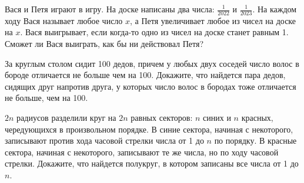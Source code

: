 \documentclass{article}
\begin{document}
\begin{enumerate_boxed}
        \item Вася и Петя играют в игру.
        На доске написаны два числа: $\frac{1}{2022}$ и  $\frac{1}{2023}$.
        На каждом ходу Вася называет любое число $x$, а Петя увеличивает любое из чисел на доске на $x$.
        Вася выигрывает, если когда-то одно из чисел на доске станет равным 1.
        Сможет ли Вася выиграть, как бы ни действовал Петя?

        \item За круглым столом сидит 100 дедов, причем у любых двух соседей число волос в бороде отличается не больше чем на 100.
        Докажите, что найдется пара дедов, сидящих друг напротив друга, у которых число волос в бородах тоже отличается не больше, чем на 100.

        \item $2n$ радиусов разделили круг на $2n$ равных секторов: $n$ синих и $n$ красных, чередующихся в произвольном порядке.
        В синие сектора, начиная с некоторого, записывают против хода часовой стрелки числа от 1 до $n$ по порядку.
        В красные сектора, начиная с некоторого, записывают те же числа, но по ходу часовой стрелки.
        Докажите, что найдется полукруг, в котором записаны все числа от 1 до $n$.

    \end{enumerate_boxed}
\end{document}
